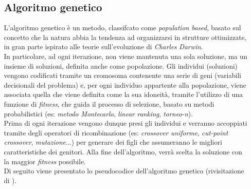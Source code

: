 \subsection{Algoritmo genetico}
\noindent L'algoritmo genetico \cite{site:dispense-de-giovanni} è un metodo, classifcato come \textit{population based}, basato sul concetto che la natura
abbia la tendenza ad organizzarsi in strutture ottimizzate, in gran parte ispirato
alle teorie sull'evoluzione di \textit{Charles Darwin}.\\
\noindent In particolare, ad ogni iterazione, non viene mantenuta una sola soluzione, ma un insieme di soluzioni, definita anche come popolazione.
Gli individui (soluzioni) vengono codificati tramite un cromosoma contenente una serie di geni (variabili decisionali del problema) e, per
ogni individuo appartente alla popolazione, viene associata quella che viene definita come la sua idoneità, tramite l'utilizzo di una
funzione di \textit{fitness}, che guida il processo di selezione, basato su metodi probabilistici (es: \textit{metodo Montecarlo}, \textit{linear ranking}, \textit{torneo-n}).\\
Prima di ogni iterazione vengono dunque presi gli individui e verranno accoppiati tramite degli operatori di ricombinazione
(es: \textit{crossover uniforme}, \textit{cut-point crossover}, \textit{mutazione}...)
per generare dei figli che assumeranno le migliori caratteristiche dei genitori. Alla fine dell'algoritmo, verrà scelta la soluzione con la maggior \textit{fitness} possibile.\\
Di seguito viene presentato lo pseudocodice dell'algoritmo genetico (rivisitazione di \cite{site:solid-github}).
\vspace*{\fill}
